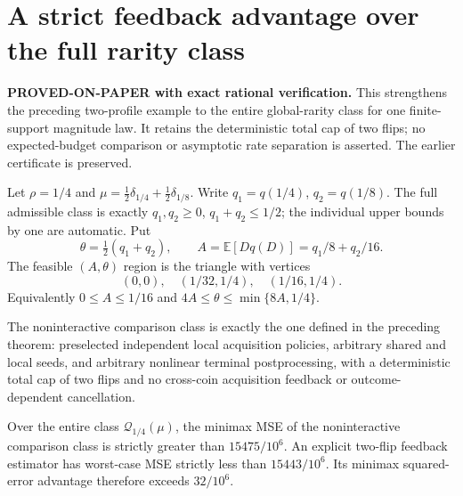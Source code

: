 \section{A strict feedback advantage over the full rarity class}
\label{sec:feedback-full-class}
\noindent\textbf{PROVED-ON-PAPER with exact rational verification.}
This strengthens the preceding two-profile example to the entire
global-rarity class for one finite-support magnitude law. It retains the
deterministic total cap of two flips; no expected-budget comparison or
asymptotic rate separation is asserted. The earlier certificate is preserved.

Let $\rho=1/4$ and
$\mu=\tfrac12\delta_{1/4}+\tfrac12\delta_{1/8}$.
Write $q_1=q(1/4)$, $q_2=q(1/8)$. The full admissible class is exactly
$q_1,q_2\ge0$, $q_1+q_2\le1/2$; the individual upper bounds by one
are automatic. Put
\[
 \theta=\tfrac12(q_1+q_2),\qquad
 A=\mathbb E[Dq(D)]=q_1/8+q_2/16.
\]
The feasible $(A,\theta)$ region is the triangle with vertices
\[
 (0,0),\quad(1/32,1/4),\quad(1/16,1/4).
\]
Equivalently $0\le A\le1/16$ and
$4A\le\theta\le\min\{8A,1/4\}$.

The noninteractive comparison class is exactly the one defined in the
preceding theorem: preselected independent local acquisition policies,
arbitrary shared and local seeds, and arbitrary nonlinear terminal
postprocessing, with a deterministic total cap of two flips and no
cross-coin acquisition feedback or outcome-dependent cancellation.

\begin{theorem}\label{feedback:full-class}
Over the entire class $\mathcal Q_{1/4}(\mu)$, the minimax MSE of the
noninteractive comparison class is strictly greater than $15475/10^6$.
An explicit two-flip feedback estimator has worst-case MSE strictly less
than $15443/10^6$. Its minimax squared-error advantage therefore exceeds
$32/10^6$.
\end{theorem}

